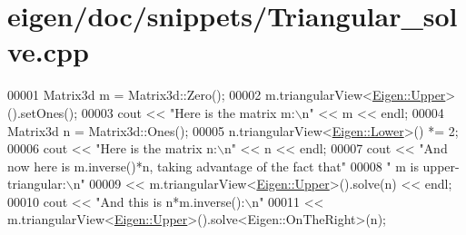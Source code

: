 \hypertarget{eigen_2doc_2snippets_2_triangular__solve_8cpp_source}{}\section{eigen/doc/snippets/\+Triangular\+\_\+solve.cpp}
\label{eigen_2doc_2snippets_2_triangular__solve_8cpp_source}

\begin{DoxyCode}
00001 Matrix3d m = Matrix3d::Zero();
00002 m.triangularView<\hyperlink{group__enums_gga39e3366ff5554d731e7dc8bb642f83cda6bcb58be3b8b8ec84859ce0c5ac0aaec}{Eigen::Upper}>().setOnes();
00003 cout << \textcolor{stringliteral}{"Here is the matrix m:\(\backslash\)n"} << m << endl;
00004 Matrix3d n = Matrix3d::Ones();
00005 n.triangularView<\hyperlink{group__enums_gga39e3366ff5554d731e7dc8bb642f83cda891792b8ed394f7607ab16dd716f60e6}{Eigen::Lower}>() *= 2;
00006 cout << \textcolor{stringliteral}{"Here is the matrix n:\(\backslash\)n"} << n << endl;
00007 cout << \textcolor{stringliteral}{"And now here is m.inverse()*n, taking advantage of the fact that"}
00008         \textcolor{stringliteral}{" m is upper-triangular:\(\backslash\)n"}
00009      << m.triangularView<\hyperlink{group__enums_gga39e3366ff5554d731e7dc8bb642f83cda6bcb58be3b8b8ec84859ce0c5ac0aaec}{Eigen::Upper}>().solve(n) << endl;
00010 cout << \textcolor{stringliteral}{"And this is n*m.inverse():\(\backslash\)n"}
00011      << m.triangularView<\hyperlink{group__enums_gga39e3366ff5554d731e7dc8bb642f83cda6bcb58be3b8b8ec84859ce0c5ac0aaec}{Eigen::Upper}>().solve<Eigen::OnTheRight>(n);
\end{DoxyCode}
